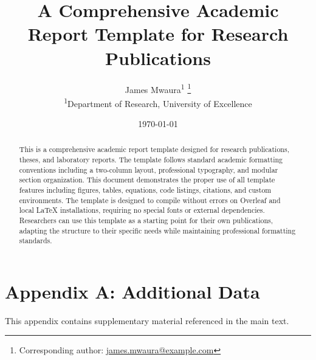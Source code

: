 \documentclass{Seka}
\title{A Comprehensive Academic Report Template for Research Publications}
\author{James Mwaura\textsuperscript{1}%
\thanks{Corresponding author: \href{mailto:james.mwaura@example.com}{james.mwaura@example.com}}
\\[2pt]
\textsuperscript{1}Department of Research, University of Excellence}
\date{\today}
\begin{document}
\maketitle
\thispagestyle{firststyle}  %


\begin{abstract}
This is a comprehensive academic report template designed for research publications, theses, and laboratory reports. The template follows standard academic formatting conventions including a two-column layout, professional typography, and modular section organization. This document demonstrates the proper use of all template features including figures, tables, equations, code listings, citations, and custom environments. The template is designed to compile without errors on Overleaf and local LaTeX installations, requiring no special fonts or external dependencies. Researchers can use this template as a starting point for their own publications, adapting the structure to their specific needs while maintaining professional formatting standards.
\end{abstract}













\appendix
\section{Appendix A: Additional Data}
\label{app:data}

This appendix contains supplementary material referenced in the main text.
\end{document}
